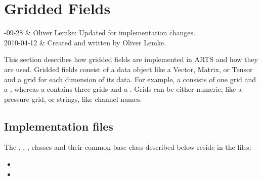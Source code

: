 %
%
\chapter{Gridded Fields}
\label{sec:griddedfields}


%
%
-09-28 & Oliver Lemke: Updated for implementation changes.\\
  2010-04-12 & Created and written by Oliver Lemke.\\
\stophistory




%
%

This section describes how gridded fields are implemented in ARTS and
how they are used. Gridded fields consist of a data object like a
Vector, Matrix, or Tensor and a grid for each dimension of its data.
For example, a  consists of one grid and a
, whereas a  contains three grids
and a . Grids can be either numeric, like a pressure grid,
or strings, like channel names.


\section{Implementation files}
\label{sec:griddedfields:files}

The , ,
,  classes and their common
base class  described below reside in the files:

\begin{itemize}
\item {}
\item {}
\end{itemize}

